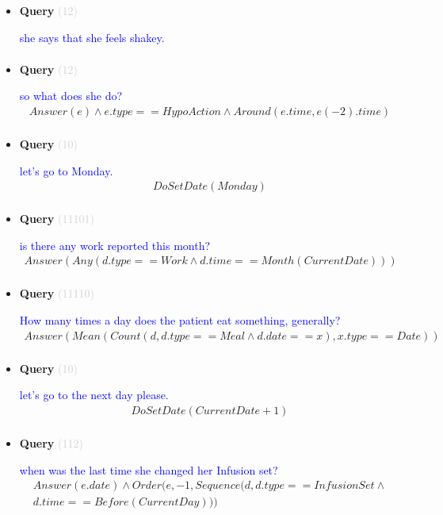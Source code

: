 \documentclass[11pt]{article}
\newcommand{\key}[1]{\textcolor{lightgray}{#1}}
\newcounter{CQuery}
\begin{document}
\begin{itemize}
\item
\textbf{Query\theCQuery} \key{(12)} \addtocounter{CQuery}{1}
\textcolor{blue}{ she says that she feels shakey. }
\begin{multline*}
\end{multline*}


\item
\textbf{Query\theCQuery} \key{(12)} \addtocounter{CQuery}{1}
\textcolor{blue}{ so what does she do? }
\begin{multline*}
Answer(e) \wedge e.type == HypoAction \wedge Around(e.time, e(-2).time) \\ 
\end{multline*}


\item
\textbf{Query\theCQuery} \key{(10)} \addtocounter{CQuery}{1}
\textcolor{blue}{ let's go to Monday. }
\begin{multline*}
DoSetDate(Monday) \\ 
\end{multline*}


\item
\textbf{Query\theCQuery} \key{(11101)} \addtocounter{CQuery}{1}
\textcolor{blue}{ is there any work reported this month? }
\begin{multline*}
Answer(Any(d.type==Work \wedge d.time==Month(CurrentDate))) \\ 
\end{multline*}


\item
\textbf{Query\theCQuery} \key{(11110)} \addtocounter{CQuery}{1}
\textcolor{blue}{ How many times a day does the patient eat something, generally? }
\begin{multline*}
Answer(Mean(Count(d, d.type==Meal \wedge d.date==x), x.type==Date)) \\ 
\end{multline*}


\item
\textbf{Query\theCQuery} \key{(10)} \addtocounter{CQuery}{1}
\textcolor{blue}{ let's go to the next day please. }
\begin{multline*}
DoSetDate(CurrentDate + 1) \\ 
\end{multline*}


\item
\textbf{Query\theCQuery} \key{(112)} \addtocounter{CQuery}{1}
\textcolor{blue}{ when was the last time she changed her Infusion set? }
\begin{multline*}
Answer(e.date) \wedge Order(e, -1, Sequence(d, d.type==InfusionSet\wedge \\ 
d.time==Before(CurrentDay))) \\ 
\end{multline*}



\end{itemize}
\end{document}
